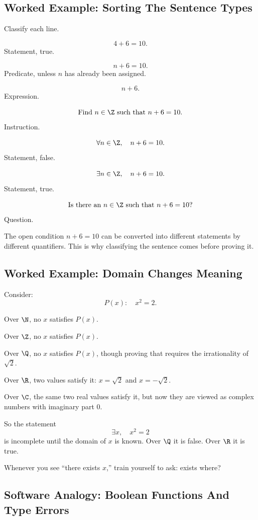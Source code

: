\subsection{Worked Example: Sorting The Sentence Types}

Classify each line.

\[
4+6=10.
\]
Statement, true.

\[
n+6=10.
\]
Predicate, unless $n$ has already been assigned.

\[
n+6.
\]
Expression.

\[
\text{Find }n\in\Z\text{ such that }n+6=10.
\]
Instruction.

\[
\forall n\in\Z,\quad n+6=10.
\]
Statement, false.

\[
\exists n\in\Z,\quad n+6=10.
\]
Statement, true.

\[
\text{Is there an }n\in\Z\text{ such that }n+6=10?
\]
Question.

The open condition $n+6=10$ can be converted into different statements by different quantifiers. This is why classifying the sentence comes before proving it.

\subsection{Worked Example: Domain Changes Meaning}

Consider:
\[
P(x):\quad x^2=2.
\]

Over $\N$, no $x$ satisfies $P(x)$.

Over $\Z$, no $x$ satisfies $P(x)$.

Over $\Q$, no $x$ satisfies $P(x)$, though proving that requires the irrationality of $\sqrt2$.

Over $\R$, two values satisfy it: $x=\sqrt2$ and $x=-\sqrt2$.

Over $\C$, the same two real values satisfy it, but now they are viewed as complex numbers with imaginary part $0$.

So the statement
\[
\exists x,\quad x^2=2
\]
is incomplete until the domain of $x$ is known. Over $\Q$ it is false. Over $\R$ it is true.

\begin{focusbox}
Whenever you see ``there exists $x$,'' train yourself to ask: exists where?
\end{focusbox}

\subsection{Software Analogy: Boolean Functions And Type Errors}


